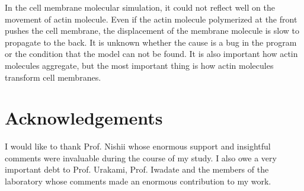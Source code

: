 \documentclass[a4paper,12pt, oneside]{book}
\begin{document}
In the cell membrane molecular simulation, it could not reflect well on the movement of actin molecule.
Even if the actin molecule polymerized at the front pushes the cell membrane, the displacement of the membrane molecule is slow to propagate to the back.
It is unknown whether the cause is a bug in the program or the condition that the model can not be found.
It is also important how actin molecules aggregate, but the most important thing is how actin molecules transform cell membranes.


\chapter*{Acknowledgements}
I would like to thank Prof. Nishii whose enormous support and insightful comments were invaluable during the course of my study. I also owe a very important debt to Prof. Urakami, Prof. Iwadate and the members of the laboratory whose comments made an enormous contribution to my work. 




\end{document}

